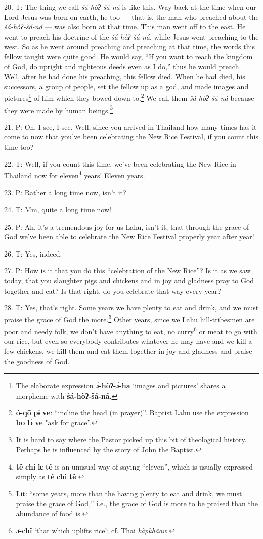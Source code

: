 20. T: The thing we call \textit{šá-hòʔ-šá-ná }is like this. Way back at
the time when our Lord Jesus was born on earth, he too --- that is, the man who
preached about the \textit{šá-hòʔ-šá-ná} --- was also born at that time.
This man went off to the east. He went to preach his doctrine of the \textit{šá-hòʔ-šá-ná},
while Jesus went preaching to the west. So as he went around preaching and preaching
at that time, the words this fellow taught were quite good. He would say, ``If
you want to reach the kingdom of God, do upright and righteous deeds even as I
do,'' thus he would preach. Well, after he had done his preaching, this fellow
died. When he had died, his successors, a group of people, set the fellow up as
a god, and made images and pictures\footnote{The elaborate expression \textbf{ɔ̀-hòʔ-ɔ̀-ha} `images and pictures' shares a morpheme with \textbf{šá-hòʔ-šá-ná}.} of him which they bowed down to.\footnote{\textbf{ó-qō} \textbf{pɨ} \textbf{ve}: ``incline the head (in prayer)''. Baptist Lahu use the expression \textbf{bo} \textbf{lɔ̀} \textbf{ve} "ask for grace''.} We
call them \textit{šá-hòʔ-šá-ná} because they were made by human beings.\footnote{It is hard to say where the Pastor picked up this bit of theological history. Perhaps he is influenced by the story of John the Baptist.}

21. P: Oh, I see, I see. Well, since you arrived in Thailand how many times has
it come to now that you've been celebrating the New Rice Festival, if you count
this time too?

22. T: Well, if you count this time, we've been celebrating the New Rice in Thailand
now for eleven\footnote{\textbf{tê} \textbf{chi} \textbf{lɛ} \textbf{tê} is an unusual way of saying ``eleven'', which is usually expressed simply as \textbf{tê} \textbf{chi} \textbf{tê}.} years! Eleven years.

23. P: Rather a long time now, isn't it?

24. T: Mm, quite a long time now!

25. P: Ah, it's a tremendous joy for us Lahu, isn't it, that through the grace of
God we've been able to celebrate the New Rice Festival properly year after year!

26. T: Yes, indeed.

27. P: How is it that you do this ``celebration of the New Rice''?
Is it as we saw today, that you slaughter pigs and chickens and in joy and gladness
pray to God together and eat? Is that right, do you celebrate that way every year?

28. T: Yes, that's right. Some years we have plenty to eat and drink, and we must
praise the grace of God the more.\footnote{Lit: ``some years, more than the having plenty to eat and drink, we must praise the grace of God,'' i.e., the grace of God is more to be praised than the abundance of food is.} Other years, since we Lahu hill-tribesmen
are poor and needy folk, we don't have anything to eat, no curry\footnote{\textbf{ɔ̄-chî} `that which uplifts rice'; cf. Thai \textit{kàpkhâaw}.} or meat to
go with our rice, but even so everybody contributes whatever he may have and we
kill a few chickens, we kill them and eat them together in joy and gladness and
praise the goodness of God.

